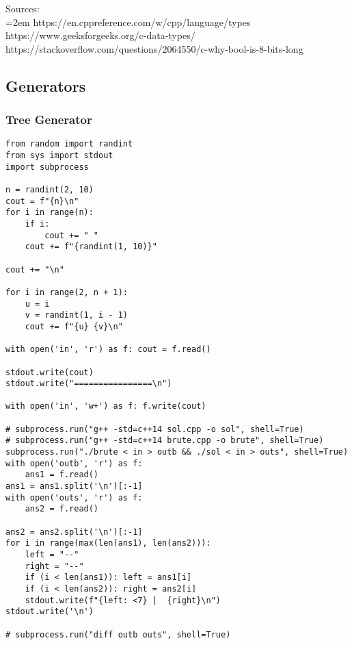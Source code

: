 \documentclass[twoside]{article}
\newcommand{\fileTitleStyle}{\large\underline}
\begin{document}
Sources:\\
\hangindent=2em
\textcolor{prussianblue}{https://en.cppreference.com/w/cpp/language/types}\\
\textcolor{prussianblue}{https://www.geeksforgeeks.org/c-data-types/}\\
\textcolor{prussianblue}{https://stackoverflow.com/questions/2064550/c-why-bool-is-8-bits-long}
\begin{multicols*}{2}
\subsectionfont{\centering\bfseries\LARGE}
\vspace{0em}
\subsection*{Generators}
\vspace{2em}
\subsubsectionfont{\centering\bfseries\Large}
\subsubsectionfont{\fileTitleStyle}
\subsubsection*{Tree Generator}
\begin{verbatim}
from random import randint
from sys import stdout
import subprocess

n = randint(2, 10)
cout = f"{n}\n"
for i in range(n):
    if i:
        cout += " "
    cout += f"{randint(1, 10)}"

cout += "\n"

for i in range(2, n + 1):
    u = i
    v = randint(1, i - 1)
    cout += f"{u} {v}\n"

with open('in', 'r') as f: cout = f.read()

stdout.write(cout)
stdout.write("================\n")

with open('in', 'w+') as f: f.write(cout)

# subprocess.run("g++ -std=c++14 sol.cpp -o sol", shell=True)
# subprocess.run("g++ -std=c++14 brute.cpp -o brute", shell=True)
subprocess.run("./brute < in > outb && ./sol < in > outs", shell=True)
with open('outb', 'r') as f:
    ans1 = f.read()
ans1 = ans1.split('\n')[:-1]
with open('outs', 'r') as f:
    ans2 = f.read()

ans2 = ans2.split('\n')[:-1]
for i in range(max(len(ans1), len(ans2))):
    left = "--"
    right = "--"
    if (i < len(ans1)): left = ans1[i]
    if (i < len(ans2)): right = ans2[i]
    stdout.write(f"{left: <7} |  {right}\n")
stdout.write('\n')

# subprocess.run("diff outb outs", shell=True)
\end{verbatim}

\end{multicols*}
\subsectionfont{\centering\bfseries\LARGE}
\vspace{0em}
\end{document}
